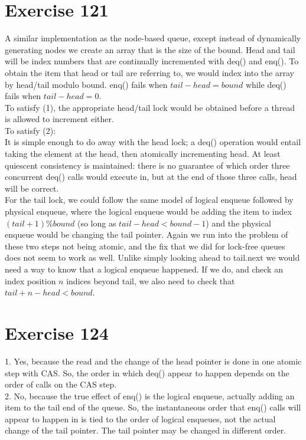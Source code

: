 \documentclass{article}
\begin{document}
\begin{adjustwidth}{-2cm}{-2cm}
\section{Exercise 121}
A similar implementation as the node-based queue, except instead of dynamically generating nodes we create an array that is the size of the bound. Head and tail will be index numbers that are continually incremented with deq() and enq(). To obtain the item that head or tail are referring to, we would index into the array by head/tail modulo bound. enq() fails when $tail-head=bound$ while deq() fails when $tail-head=0$.\\
To satisfy (1), the appropriate head/tail lock would be obtained before a thread is allowed to increment either.\\
To satisfy (2):\\
It is simple enough to do away with the head lock; a deq() operation would entail taking the element at the head, then atomically incrementing head. At least quiescent consistency is maintained: there is no guarantee of which order three concurrent deq() calls would execute in, but at the end of those three calls, head will be correct.\\
For the tail lock, we could follow the same model of logical enqueue followed by physical enqueue, where the logical enqueue would be adding the item to index $(tail+1) \% bound$ (so long as $tail-head<bound-1$) and the physical enqueue would be changing the tail pointer. Again we run into the problem of these two steps not being atomic, and the fix that we did for lock-free queues does not seem to work as well. Unlike simply looking ahead to tail.next we would need a way to know that a logical enqueue happened. If we do, and check an index position $n$ indices beyond tail, we also need to check that $tail + n - head < bound$. 
\section{Exercise 124}
1. Yes, because the read and the change of the head pointer is done in one atomic step with CAS. So, the order in which deq() appear to happen depends on the order of calls on the CAS step.\\
2. No, because the true effect of enq() is the logical enqueue, actually adding an item to the tail end of the queue. So, the instantaneous order that enq() calls will appear to happen in is tied to the order of logical enqueues, not the actual change of the tail pointer. The tail pointer may be changed in different order.

\end{adjustwidth}
\end{document}
